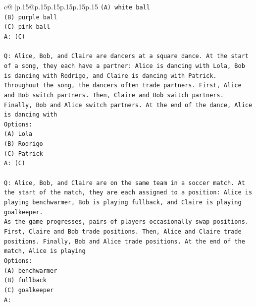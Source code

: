 \documentclass{article}
\begin{document}
{\begin{supertabular}{c@{$\;$}|p{.15\linewidth}@{}p{.15\linewidth}p{.15\linewidth}p{.15\linewidth}p{.15\linewidth}p{.15\linewidth}}
{{{\texttt{(A) white ball} \\
\texttt{(B) purple ball} \\
\texttt{(C) pink ball} \\
\texttt{A: (C)} \\
\\ 
\texttt{Q: Alice, Bob, and Claire are dancers at a square dance. At the start of a song, they each have a partner: Alice is dancing with Lola, Bob is dancing with Rodrigo, and Claire is dancing with Patrick.} \\
\texttt{Throughout the song, the dancers often trade partners. First, Alice and Bob switch partners. Then, Claire and Bob switch partners. Finally, Bob and Alice switch partners. At the end of the dance, Alice is dancing with} \\
\texttt{Options:} \\
\texttt{(A) Lola} \\
\texttt{(B) Rodrigo} \\
\texttt{(C) Patrick} \\
\texttt{A: (C)} \\
\\ 
\texttt{Q: Alice, Bob, and Claire are on the same team in a soccer match. At the start of the match, they are each assigned to a position: Alice is playing benchwarmer, Bob is playing fullback, and Claire is playing goalkeeper.} \\
\texttt{As the game progresses, pairs of players occasionally swap positions. First, Claire and Bob trade positions. Then, Alice and Claire trade positions. Finally, Bob and Alice trade positions. At the end of the match, Alice is playing} \\
\texttt{Options:} \\
\texttt{(A) benchwarmer} \\
\texttt{(B) fullback} \\
\texttt{(C) goalkeeper} \\
\texttt{A:} \\
            }
        }
    }
     \\ \\


\end{supertabular}}
\end{document}
